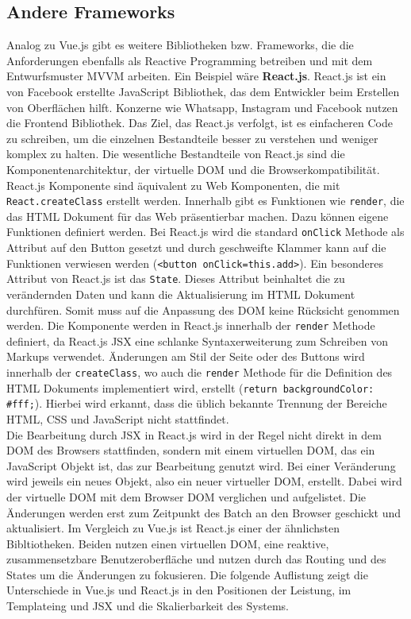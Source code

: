 \subsection{Andere Frameworks}
Analog zu Vue.js gibt es weitere Bibliotheken bzw. Frameworks, die die Anforderungen ebenfalls als Reactive Programming betreiben und mit dem Entwurfsmuster \ac{MVVM} arbeiten. Ein Beispiel w\"are \textbf{React.js}.
React.js ist ein von Facebook erstellte JavaScript Bibliothek, das dem Entwickler beim Erstellen von Oberfl\"achen hilft. Konzerne wie Whatsapp, Instagram und Facebook nutzen die Frontend Bibliothek. Das Ziel, das React.js verfolgt, ist es einfacheren Code zu schreiben, um die einzelnen Bestandteile besser zu verstehen und weniger komplex zu halten. Die wesentliche Bestandteile von React.js sind die Komponentenarchitektur, der virtuelle \ac{DOM} und die Browserkompatibilit\"at.\\
React.js Komponente sind \"aquivalent zu Web Komponenten, die mit \texttt{React.createClass} erstellt werden. Innerhalb gibt es Funktionen wie \texttt{render}, die das \ac{HTML} Dokument f\"ur das Web pr\"asentierbar machen. Dazu k\"onnen eigene Funktionen definiert werden. Bei React.js wird die standard \texttt{onClick} Methode als Attribut auf den Button gesetzt und durch geschweifte Klammer kann auf die Funktionen verwiesen werden (\texttt{<button onClick={this.add}>}). Ein besonderes Attribut von React.js ist das \texttt{State}. Dieses Attribut beinhaltet die zu ver\"andernden Daten und kann die Aktualisierung im \ac{HTML} Dokument durchf\"uren. Somit muss auf die Anpassung des \ac{DOM} keine R\"ucksicht genommen werden. Die Komponente werden in React.js innerhalb der \texttt{render} Methode definiert, da React.js JSX eine schlanke Syntaxerweiterung zum Schreiben von Markups verwendet. \"Anderungen am Stil der Seite oder des Buttons wird innerhalb der \texttt{createClass}, wo auch die \texttt{render} Methode f\"ur die Definition des \ac{HTML} Dokuments implementiert wird, erstellt (\texttt{return {backgroundColor: \#fff};}). Hierbei wird erkannt, dass die \"ublich bekannte Trennung der Bereiche \ac{HTML}, \ac{CSS} und JavaScript nicht stattfindet\cite{Kogel2015}. \\
Die Bearbeitung durch JSX in React.js wird in der Regel nicht direkt in dem \ac{DOM} des Browsers stattfinden, sondern mit einem virtuellen \ac{DOM}, das ein JavaScript Objekt ist, das zur Bearbeitung genutzt wird. Bei einer Ver\"anderung wird jeweils ein neues Objekt, also ein neuer virtueller \ac{DOM}, erstellt. Dabei wird der virtuelle \ac{DOM} mit dem Browser \ac{DOM} verglichen und aufgelistet. Die \"Anderungen werden erst zum Zeitpunkt des Batch an den Browser geschickt und aktualisiert\cite{Skirzynski2015}. Im Vergleich zu Vue.js ist React.js einer der \"ahnlichsten Bibltiotheken. Beiden nutzen einen virtuellen \ac{DOM}, eine reaktive, zusammensetzbare Benutzeroberfl\"ache und nutzen durch das Routing und des States um die \"Anderungen zu fokusieren. Die folgende Auflistung zeigt die Unterschiede in Vue.js und React.js in den Positionen der Leistung, im Templateing und JSX und die Skalierbarkeit des Systems.
